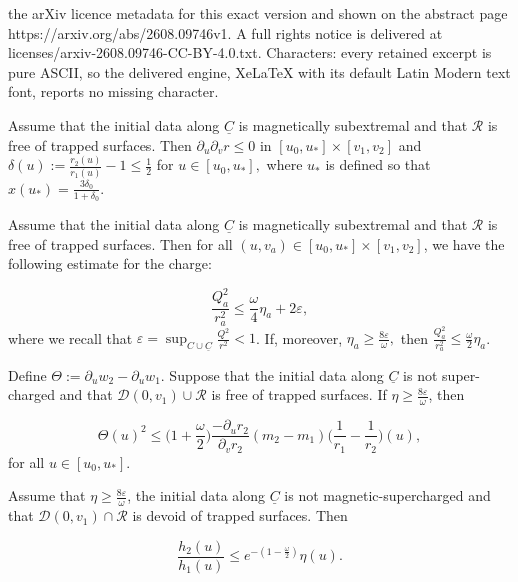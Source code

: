 \documentclass[10pt,a4paper]{amsart}
\newcommand{\Cbar}{\underline{C}}
\begin{document}
the arXiv licence metadata for this exact version and shown on the abstract page https://arxiv.org/abs/2608.09746v1. A full rights notice is delivered at licenses/arxiv-2608.09746-CC-BY-4.0.txt. Characters: every retained excerpt is pure ASCII, so the delivered engine, XeLaTeX with its default Latin Modern text font, reports no missing character.
\begin{proposition} \label{propmonotonicity}
Assume that the initial data along $\Cbar$ is magnetically subextremal and that $\mathcal{R}$ is free of trapped surfaces. Then $\partial_u\partial_v r \leq 0$ in $[u_0, u_*] \times [v_1,v_2]$ and $\delta(u):= \frac{r_2(u)}{r_1(u)}-1 \leq \frac{1}{2}$ for $u \in [u_0, u_*],$ where $u_*$ is defined so that $x(u_*)= \frac{3\delta_0}{1+\delta_0}.$ 
\end{proposition}

\begin{lemma} \label{lemmaomegaeta}
Assume that the initial data along $\Cbar$ is magnetically subextremal and that $\mathcal{R}$ is free of trapped surfaces. Then for all $(u,v_a) \in [u_0, u_*] \times [v_1,v_2]$, we have the following estimate for the charge:

\[  \frac{Q_a^2}{r_a^2}\leq \frac{\omega}{4}\eta_a+2\varepsilon,  \]where we recall that $\varepsilon = \sup_{C \cup \Cbar}\frac{Q^2}{r^2} <1$. If, moreover, $\eta_a \geq \frac{8\varepsilon}{\omega},$ then $\frac{Q_a^2}{r_a^2}\leq \frac{\omega}{2}\eta_a$.
\end{lemma}

\begin{lemma} \label{Thetalemma}
Define $\Theta:= \partial_u w_2 - \partial_u w_1$. Suppose that the initial data along $\Cbar$ is not super-charged and that $\mathcal{D}(0,v_1)\cup \mathcal{R}$ is free of trapped surfaces. If $\eta \geq \frac{8 \varepsilon}{\omega}$, then 

\[  \Theta(u)^2 \leq \big(1 +\frac{\omega}{2}\big) \frac{- \partial_u r_2}{\partial_v r_2}(m_2-m_1)\bigg( \frac{1}{r_1}- \frac{1}{r_2}\bigg)(u),    \]for all $u \in [u_0, u_*]$.
\end{lemma}

\begin{lemma} \label{hlemma}
Assume that $\eta \geq \frac{8 \varepsilon}{\omega}$, the initial data along $\Cbar$ is not magnetic-supercharged and that $\mathcal{D}(0,v_1)\cap \mathcal{R}$ is devoid of trapped surfaces. Then

\[ \frac{h_2(u)}{h_1(u)}\leq e^{-(1-\frac{\omega}{2})}\eta(u).      \]
\end{lemma}
\end{document}
